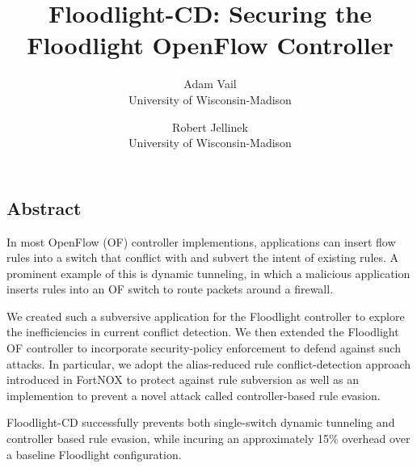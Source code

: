 \documentclass[letterpaper,twocolumn,10pt]{article}
\begin{document}
\date{}

\title{\Large \bf Floodlight-CD: Securing the Floodlight OpenFlow Controller}

\author{
{\rm Adam Vail}\\
University of Wisconsin-Madison
\and
{\rm Robert Jellinek}\\
University of Wisconsin-Madison
} %

\maketitle

\thispagestyle{empty}


\subsection*{Abstract}
In most OpenFlow (OF) controller implementions, applications can insert flow rules into a switch that conflict with and subvert the intent of existing rules. 
A prominent example of this is dynamic tunneling, in which a malicious application inserts rules into an OF switch to route packets around a firewall. 

We created such a subversive application for the Floodlight controller to explore the inefficiencies in current conflict detection.
We then extended the Floodlight OF controller to incorporate security-policy enforcement to defend against such attacks. 
In particular, we adopt the alias-reduced rule conflict-detection approach introduced in FortNOX to protect against rule subversion as well as an implemention to prevent a novel attack called controller-based rule evasion. 

Floodlight-CD successfully prevents both single-switch dynamic tunneling and controller based rule evasion, while incuring an approximately 15\% overhead over a baseline Floodlight configuration.









 


{\footnotesize 
}


\end{document}
